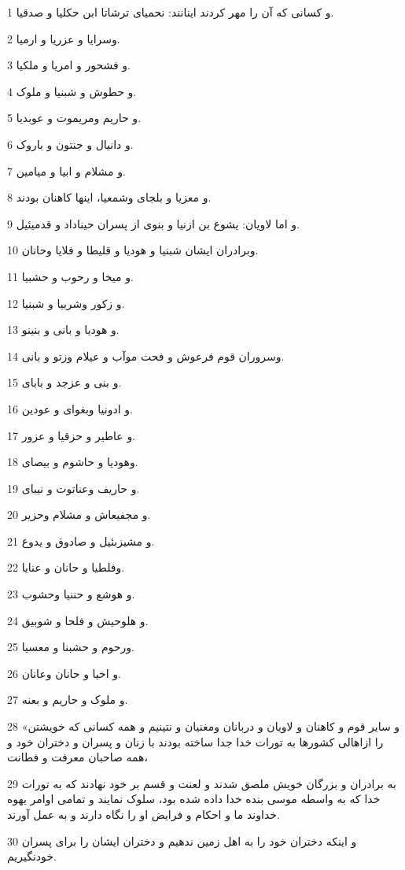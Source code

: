 \par 1 و کسانی که آن را مهر کردند اینانند: نحمیای ترشاتا ابن حکلیا و صدقیا.
\par 2 وسرایا و عزریا و ارمیا.
\par 3 و فشحور و امریا و ملکیا.
\par 4 و حطوش و شبنیا و ملوک.
\par 5 و حاریم ومریموت و عوبدیا.
\par 6 و دانیال و جنتون و باروک.
\par 7 و مشلام و ابیا و میامین.
\par 8 و معزیا و بلجای وشمعیا، اینها کاهنان بودند.
\par 9 و اما لاویان: یشوع بن ازنیا و بنوی از پسران حیناداد و قدمیئیل.
\par 10 وبرادران ایشان شبنیا و هودیا و قلیطا و فلایا وحانان.
\par 11 و میخا و رحوب و حشبیا.
\par 12 و زکور وشربیا و شبنیا.
\par 13 و هودیا و بانی و بنینو.
\par 14 وسروران قوم فرعوش و فحت موآب و عیلام وزتو و بانی.
\par 15 و بنی و عزجد و بابای.
\par 16 و ادونیا وبغوای و عودین.
\par 17 و عاطیر و حزقیا و عزور.
\par 18 وهودیا و حاشوم و بیصای.
\par 19 و حاریف وعناتوت و نیبای.
\par 20 و مجفیعاش و مشلام وحزیر.
\par 21 و مشیزبئیل و صادوق و یدوع.
\par 22 وفلطیا و حانان و عنایا.
\par 23 و هوشع و حننیا وحشوب.
\par 24 و هلوحیش و فلحا و شوبیق.
\par 25 ورحوم و حشبنا و معسیا.
\par 26 و اخیا و حانان وعانان.
\par 27 و ملوک و حاریم و بعنه.
\par 28 «و سایر قوم و کاهنان و لاویان و دربانان ومغنیان و نتینیم و همه کسانی که خویشتن را ازاهالی کشورها به تورات خدا جدا ساخته بودند با زنان و پسران و دختران خود و همه صاحبان معرفت و فطانت،
\par 29 به برادران و بزرگان خویش ملصق شدند و لعنت و قسم بر خود نهادند که به تورات خدا که به واسطه موسی بنده خدا داده شده بود، سلوک نمایند و تمامی اوامر یهوه خداوند ما و احکام و فرایض او را نگاه دارند و به عمل آورند.
\par 30 و اینکه دختران خود را به اهل زمین ندهیم و دختران ایشان را برای پسران خودنگیریم.
